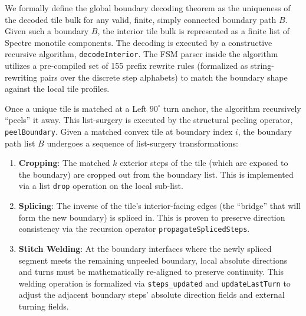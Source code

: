 \documentclass[11pt, a4paper]{amsart}
\begin{document}
We formally define the global boundary decoding theorem as the uniqueness of the decoded tile bulk for any valid, finite, simply connected boundary path $B$. Given such a boundary $B$, the interior tile bulk is represented as a finite list of Spectre monotile components. The decoding is executed by a constructive recursive algorithm, \texttt{decodeInterior}. The FSM parser inside the algorithm utilizes a pre-compiled set of 155 prefix rewrite rules (formalized as string-rewriting pairs over the discrete step alphabets) to match the boundary shape against the local tile profiles.

Once a unique tile is matched at a Left $90^\circ$ turn anchor, the algorithm recursively ``peels'' it away. This list-surgery is executed by the structural peeling operator, \texttt{peelBoundary}. Given a matched convex tile at boundary index $i$, the boundary path list $B$ undergoes a sequence of list-surgery transformations:
\begin{enumerate}
    \item \textbf{Cropping}: The matched $k$ exterior steps of the tile (which are exposed to the boundary) are cropped out from the boundary list. This is implemented via a list \texttt{drop} operation on the local sub-list.
    \item \textbf{Splicing}: The inverse of the tile's interior-facing edges (the ``bridge'' that will form the new boundary) is spliced in. This is proven to preserve direction consistency via the recursion operator \texttt{propagateSplicedSteps}.
    \item \textbf{Stitch Welding}: At the boundary interfaces where the newly spliced segment meets the remaining unpeeled boundary, local absolute directions and turns must be mathematically re-aligned to preserve continuity. This welding operation is formalized via \texttt{steps\_updated} and \texttt{updateLastTurn} to adjust the adjacent boundary steps' absolute direction fields and external turning fields.
\end{enumerate}
\end{document}
